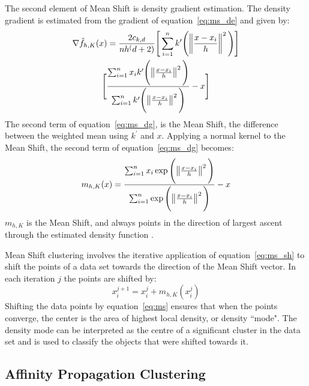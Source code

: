 The second element of Mean Shift is density gradient estimation. 
The density gradient is estimated from the gradient of equation~\ref{eq:ms_de} and given by: 
\begin{multline}
\label{eq:ms_dg}
\nabla\hat{f}_{h,K}(x) = \frac{2c_{k,d}}{nh^(d+2)} \Bigg[ \sum_{i=1}^n k^{\prime} \Bigg( \norm{\frac{x-x_{i}}{h}}^2 \Bigg) \Bigg] \\ \Bigg[\frac{\sum_{i=1}^n x_{i}k^{\prime} \Bigg( \norm{\frac{x-x_{i}}{h}}^2 \Bigg)}{\sum_{i=1}^n k^{\prime} \Bigg( \norm{\frac{x-x_{i}}{h}}^2 \Bigg)} - x \Bigg]
\end{multline}
The second term of equation~\ref{eq:ms_dg}, is the Mean Shift, the difference between the weighted mean using $k^{\prime}$ and $x$.
Applying a normal kernel to the Mean Shift, the second term of equation~\ref{eq:ms_dg} becomes: 
\begin{equation} 
\label{eq:ms_sh}
m_{h,K}(x) = \frac{\sum_{i=1}^n x_{i} \exp \Bigg(\norm{\frac{x-x_{i}}{h}}^2 \Bigg)}{\sum_{i=1}^n \exp \Bigg(\norm{\frac{x-x_{i}}{h}}^2 \Bigg)} - x
\end{equation}
$m_{h,K}$ is the Mean Shift, and always points in the direction of largest ascent through the estimated density function \citet{vatturi09}.

Mean Shift clustering involves the iterative application of equation~\ref{eq:ms_sh} to shift the points of a data set towards the direction of the Mean Shift vector.
In each iteration $j$ the points are shifted by: 
\begin{equation}
\label{eq:ms}
x_i^{j+1} = x_i^j + m_{h,K}(x_i^j)
\end{equation}
Shifting the data points by equation~\ref{eq:ms} ensures that when the points converge, the center is the area of highest local density, or density ``mode". 
The density mode can be interpreted as the centre of a significant cluster in the data set and is used to classify the objects that were shifted towards it.

\subsection{Affinity Propagation Clustering}\label{sec:methods_ap}

